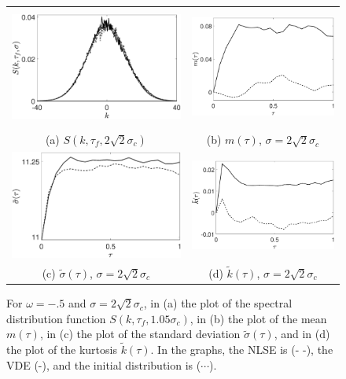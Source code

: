 \documentclass[a4paper,11pt]{article}
\begin{document}
\begin{figure}[!ht]
\centering
\begin{tabular}{cc}
\includegraphics[width=60mm, height=39mm]{pdf_w_nhf_ep_pt05_Nens_512_sig0_2sqrt2} & \includegraphics[width=.45\textwidth]{mean_w_nhf_ep_pt05_Nens_512_sig0_2sqrt2} \\
(a) $S(k,\tau_{f},2\sqrt{2}\sigma_{c})$ & (b) $m(\tau)$, $\sigma = 2\sqrt{2}\sigma_{c}$\\
\includegraphics[width=.48\textwidth]{std_w_nhf_ep_pt05_Nens_512_sig0_2sqrt2} & \includegraphics[width=.48\textwidth]{kts_w_nhf_ep_pt05_Nens_512_sig0_2sqrt2} \\
(c) $\tilde{\sigma}(\tau)$, $\sigma = 2\sqrt{2}\sigma_{c}$ & (d) $\tilde{k}(\tau)$, $\sigma = 2\sqrt{2}\sigma_{c}$
\end{tabular}
\caption{For $\omega=-.5$ and $\sigma=2\sqrt{2} \sigma_{c}$, in (a) the plot of the spectral distribution function $S(k,\tau_{f},1.05\sigma_{c})$, in (b) the plot of the mean $m(\tau)$, in (c) the plot of the standard deviation $\tilde{\sigma}(\tau)$, and in (d) the plot of the kurtosis $\tilde{k}(\tau)$.  In the graphs, the NLSE is (- -), the VDE (-), and the initial distribution is ($\cdots$).}
\label{fig:stbleomnhwide}
\end{figure}
\end{document}
